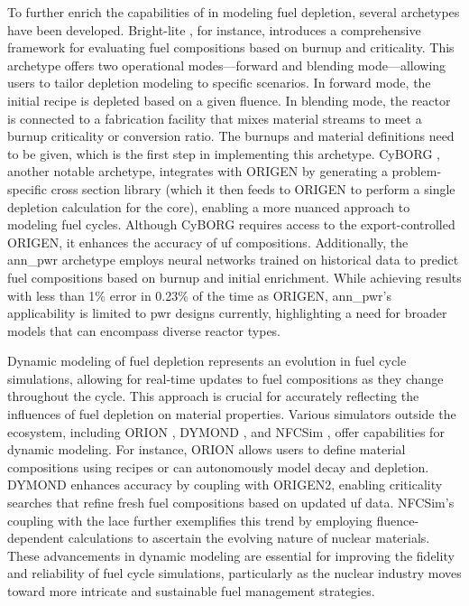 To further enrich the capabilities of \cyclus in modeling fuel depletion,
several archetypes have been developed. Bright-lite
\cite{schneider_integrated_2016}, for instance, introduces a comprehensive
framework for evaluating fuel compositions based on burnup and criticality.
This archetype offers two operational modes—forward and blending mode—allowing
users to tailor depletion modeling to specific scenarios. In forward mode, the
initial recipe is depleted based on a given fluence. In blending mode, the
reactor is connected to a fabrication facility that mixes material streams to
meet a burnup criticality or conversion ratio. The burnups and material
definitions need to be given, which is the first step in implementing this
archetype. CyBORG \cite{skutnik_cyborg_2016}, another notable archetype,
integrates \cyclus with ORIGEN by generating a problem-specific cross section
library (which it then feeds to ORIGEN to perform a single depletion
calculation for the core), enabling a more nuanced approach to modeling fuel
cycles. Although CyBORG requires access to the export-controlled ORIGEN, it
enhances the accuracy of \gls{uf} compositions. Additionally, the
ann\_pwr \cite{bae_deep_2020} archetype employs neural networks trained on
historical data to predict fuel compositions based on burnup and initial
enrichment. While achieving results with less than 1\% error in 0.23\% of the
time as ORIGEN, ann\_pwr's applicability is limited to \gls{pwr} designs
currently, highlighting a need for broader models that can encompass diverse
reactor types.

Dynamic modeling of fuel depletion represents an evolution in fuel cycle
simulations, allowing for real-time updates to fuel compositions as they change
throughout the cycle. This approach is crucial for accurately reflecting the
influences of fuel depletion on material properties. Various simulators outside
the \cyclus ecosystem, including ORION \cite{feng_standardized_2016}, DYMOND
\cite{richards_application_2021}, and NFCSim \cite{schneider_nfcsim_2005},
offer capabilities for dynamic modeling. For instance, ORION allows users to
define material compositions using recipes or can autonomously model decay and
depletion. DYMOND enhances accuracy by coupling with ORIGEN2, enabling
criticality searches that refine fresh fuel compositions based on updated
\gls{uf} data. NFCSim's coupling with the \gls{lace} further exemplifies this
trend by employing fluence-dependent calculations to ascertain the evolving
nature of nuclear materials. These advancements in dynamic modeling are
essential for improving the fidelity and reliability of fuel cycle simulations,
particularly as the nuclear industry moves toward more intricate and
sustainable fuel management strategies.

